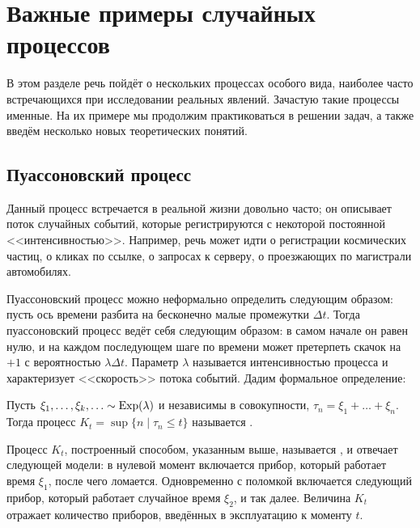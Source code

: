 \section{Важные примеры случайных процессов} \label{section:special}

В этом разделе речь пойдёт о нескольких процессах особого вида,
наиболее часто встречающихся при исследовании реальных явлений.
Зачастую такие процессы именные.
На их примере мы продолжим практиковаться в решении задач,
а также введём несколько новых теоретических понятий.


\subsection{Пуассоновский процесс} \label{subsection:special:Poisson}

Данный процесс встречается в реальной жизни довольно часто;
он описывает поток случайных событий, которые регистрируются с некоторой постоянной <<интенсивностью>>.
Например, речь может идти о регистрации космических частиц, о кликах по ссылке,
о запросах к серверу, о проезжающих по магистрали автомобилях.

Пуассоновский процесс можно неформально определить следующим образом:
пусть ось времени разбита на бесконечно малые промежутки $ \Delta t $.
Тогда пуассоновский процесс ведёт себя следующим образом:
в самом начале он равен нулю,
и на каждом последующем шаге по времени может претерпеть скачок на $ + 1 $ с вероятностью $ \lambda \Delta t $.
Параметр $ \lambda $ называется интенсивностью процесса и характеризует <<скорость>> потока событий.
Дадим формальное определение:

\begin{definition}
    \label{definition:special:Poisson_process_explicit_definition}
    Пусть $ \xi_1, \ldots, \xi_k, \ldots \sim \textnormal{Exp}(\lambda) $ и независимы в совокупности,
    $ \tau_n = \xi_1 + \ldots + \xi_n $.
    Тогда процесс $ K_t = \sup \{ n \mid \tau_n \leqslant t \} $ называется .
\end{definition}

Процесс $ K_t $, построенный
способом, указанным выше,
называется , и отвечает следующей модели:
в нулевой момент включается прибор, который работает время $ \xi_1 $, после чего ломается.
Одновременно с поломкой включается следующий прибор, который работает случайное время $ \xi_2 $, и так далее.
Величина $ K_t $ отражает количество приборов, введённых в эксплуатацию к моменту $ t $.

